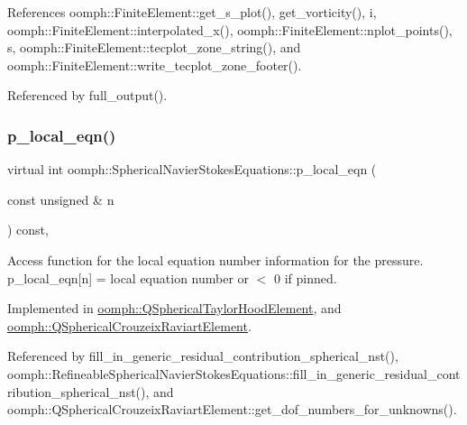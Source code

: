 References oomph\+::\+Finite\+Element\+::get\+\_\+s\+\_\+plot(), get\+\_\+vorticity(), i, oomph\+::\+Finite\+Element\+::interpolated\+\_\+x(), oomph\+::\+Finite\+Element\+::nplot\+\_\+points(), s, oomph\+::\+Finite\+Element\+::tecplot\+\_\+zone\+\_\+string(), and oomph\+::\+Finite\+Element\+::write\+\_\+tecplot\+\_\+zone\+\_\+footer().



Referenced by full\+\_\+output().

\mbox{\label{classoomph_1_1SphericalNavierStokesEquations_ad8d9a0edbe3793a008a6bff670c26643}} 
\subsubsection{\texorpdfstring{p\+\_\+local\+\_\+eqn()}{p\_local\_eqn()}}
{\footnotesize\ttfamily virtual int oomph\+::\+Spherical\+Navier\+Stokes\+Equations\+::p\+\_\+local\+\_\+eqn (\begin{DoxyParamCaption}\item[{const unsigned \&}]{n }\end{DoxyParamCaption}) const\hspace{0.3cm}{\ttfamily [protected]}, {}}



Access function for the local equation number information for the pressure. p\+\_\+local\+\_\+eqn\mbox{[}n\mbox{]} = local equation number or $<$ 0 if pinned. 



Implemented in \hyperlink{classoomph_1_1QSphericalTaylorHoodElement_a758be6fc4cc9d5e1191134412a43b83d}{oomph\+::\+Q\+Spherical\+Taylor\+Hood\+Element}, and \hyperlink{classoomph_1_1QSphericalCrouzeixRaviartElement_a5a4508bfabe7a630fd6c685ccc59870b}{oomph\+::\+Q\+Spherical\+Crouzeix\+Raviart\+Element}.



Referenced by fill\+\_\+in\+\_\+generic\+\_\+residual\+\_\+contribution\+\_\+spherical\+\_\+nst(), oomph\+::\+Refineable\+Spherical\+Navier\+Stokes\+Equations\+::fill\+\_\+in\+\_\+generic\+\_\+residual\+\_\+contribution\+\_\+spherical\+\_\+nst(), and oomph\+::\+Q\+Spherical\+Crouzeix\+Raviart\+Element\+::get\+\_\+dof\+\_\+numbers\+\_\+for\+\_\+unknowns().

